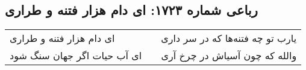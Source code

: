 \begin{center}
\section*{رباعی شماره ۱۷۲۳: ای دام هزار فتنه و طراری}
\label{sec:1723}
\begin{longtable}{l p{0.5cm} r}
ای دام هزار فتنه و طراری
&&
یارب تو چه فتنه‌ها که در سر داری
\\
ای آب حیات اگر جهان سنگ شود
&&
والله که چون آسیاش در چرخ آری
\\
\end{longtable}
\end{center}

